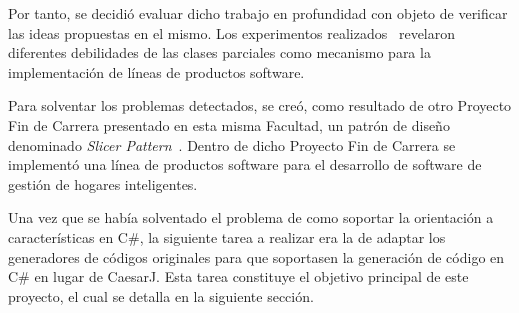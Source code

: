 Por tanto, se decidió evaluar dicho trabajo en profundidad con objeto de verificar las ideas propuestas en el mismo. Los experimentos realizados~\citep{} revelaron diferentes debilidades de las clases parciales como mecanismo para la implementación de líneas de productos software.

Para solventar los problemas detectados, se creó, como resultado de otro Proyecto Fin de Carrera presentado en esta misma Facultad, un patrón de diseño denominado \emph{Slicer Pattern}~\cite{perez:2011}. Dentro de dicho Proyecto Fin de Carrera se implementó una línea de productos software para el desarrollo de software de gestión de hogares inteligentes.

Una vez que se había solventado el problema de como soportar la orientación a características en C\#, la siguiente tarea a realizar era la de adaptar los generadores de códigos originales para que soportasen la generación de código en C\# en lugar de CaesarJ. Esta tarea constituye el objetivo principal de este proyecto, el cual se detalla en la siguiente sección.
 

